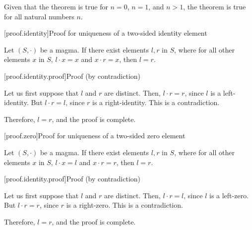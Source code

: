 Given that the theorem is true for $n = 0$, $n = 1$, and $n > 1$, the theorem is true for all
natural numbers $n$.

[proof.identity]{Proof for uniqueness of a two-sided identity element}

Let $(S, \cdot)$ be a magma. If there exist elements $l, r$ in $S$, where for all other elements $x$
in $S$, $l \cdot x = x$ and $x \cdot r = x$, then $l = r$.

[proof.identity.proof]{Proof (by contradiction)}

Let us first suppose that $l$ and $r$ are distinct. Then, $l \cdot r = r$, since $l$ is a
left-identity. But $l \cdot r = l$, since $r$ is a right-identity. This is a contradiction.

Therefore, $l = r$, and the proof is complete.

[proof.zero]{Proof for uniqueness of a two-sided zero element}

Let $(S, \cdot)$ be a magma. If there exist elements $l, r$ in $S$, where for all other elements $x$
in $S$, $l \cdot x = l$ and $x \cdot r = r$, then $l = r$.

[proof.identity.proof]{Proof (by contradiction)}

Let us first suppose that $l$ and $r$ are distinct. Then, $l \cdot r = l$, since $l$ is a
left-zero. But $l \cdot r = r$, since $r$ is a right-zero. This is a contradiction.

Therefore, $l = r$, and the proof is complete.

